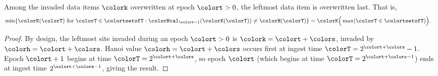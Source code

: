\begin{lemma}
\label{thm:tilted-last-overwritten}
Among the invaded data items $\colork$ overwritten at epoch $\colort > 0$, the leftmost data item is overwritten last.
That is,
\begin{align*}
\min\{ \colorK(\colorT) \text{ for } \colorT \in \colortsetofT : \colorHcal_{\colort-1}(\colorK(\colorT)) \neq \colorH(\colorT) \}
&=
\colorK\Big(\max( \colorT \in \colortsetofT )\Big).
\end{align*}
\end{lemma}
\begin{proof}
By design, the leftmost site invaded during an epoch $\colort > 0$ is $\colork = \colort + \colors$, invaded by \hv{} $\colorh = \colort + \colors$.
Hanoi value $\colorh = \colort + \colors$ occurs first at ingest time $\colorT = 2^{\colort + \colors} - 1$.
Epoch $\colort + 1$ begins at time $\colorT = 2^{\colort + \colors}$, so epoch $\colort$ (which begins at time $\colorT = 2^{\colort + \colors - 1}$) ends at ingest time $2^{\colort + \colors - 1}$, giving the result.
\end{proof}
